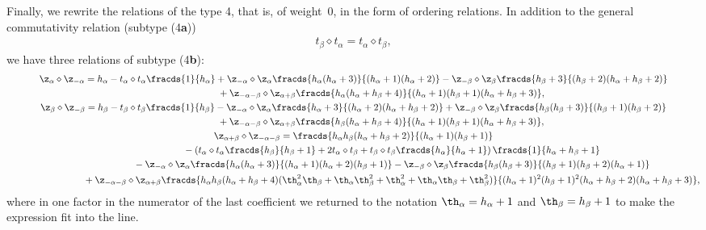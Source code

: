 \documentclass[pdftex]{sigma}
\def\a{\alpha}\def\Ar{{\rm A}}\def\Ab{\bar{\rm A}}\def\b{\beta}\def\bb{\mathfrak{b}}
\def\lb{\label}\def\lcd{\ts,\ldots,}\def\mult{\diamond}\def\n{\mathfrak{n}}\def\nminus{\mathfrak{n}_-}
\numberwithin{equation}{section}
\begin{document}
{}Finally, we rewrite the relations of the type 4, that is, of weight~0, in the form of ordering relations. In addition to the
general commutativity relation (subtype (4{\bf a}))
\begin{gather}
 t_\b\mult t_\a =t_\a\mult t_\b ,
\end{gather}
we have three relations of subtype (4{\bf b}):
\begin{gather}
\nonumber \z_\a\mult \z_{-\a} = h_\a -t_\a\mult t_\a \fracds{1}{h_\a}+\z_{-\a}\mult\z_\a \fracds{h_\a (h_\a +3)}{(h_\a +1)(h_\a +2)}
 -  \z_{-\b}\mult\z_\b  \fracds{h_\b +3}{(h_\b +2)(h_\a +h_\b +2)} \\
\phantom{\z_\a\mult \z_{-\a} =}{} + \z_{-\a -\b}\mult\z_{\a +\b} \fracds{h_\a (h_\a +h_\b +4)}{(h_\a +1)(h_\b +1)(h_\a +h_\b +3)} ,\label{zazma-rel}
\\
 \nonumber \z_\b\mult \z_{-\b}=h_\b -t_\b\mult t_\b \fracds{1}{h_\b}-\z_{-\a}\mult\z_\a \fracds{h_\a +3}{(h_\a +2)(h_\a +h_\b +2)}
 + \z_{-\b}\mult\z_\b \fracds{h_\b (h_\b +3)}{(h_\b +1)(h_\b +2)} \\
\phantom{\z_\b\mult \z_{-\b}=}{} +  \z_{-\a -\b}\mult\z_{\a +\b} \fracds{h_\b (h_\a +h_\b +4)}{(h_\a +1)(h_\b +1)(h_\a +h_\b +3)} ,\label{zbzmb-rel}\\
\nonumber \z_{\a +\b}\mult\z_{-\a -\b} =  \fracds{h_\a h_\b (h_\a +h_\b +2)}{(h_\a +1)(h_\b +1)} \\
\phantom{\z_{\a +\b}\mult\z_{-\a -\b} =}{}
 -  \left( t_\a\mult t_\a \fracds{h_\b}{h_\b +1}+2t_\a\mult t_\b +t_\b\mult t_\b \fracds{h_\a}{h_\a +1}
\right) \fracds{1}{h_\a +h_\b +1}\label{frel1} \\
\nonumber \phantom{\z_{\a +\b}\mult\z_{-\a -\b} =}{}  -  \z_{-\a}\mult\z_\a \fracds{h_\a (h_\a +3)}{(h_\a +1)(h_\a +2)(h_\b +1)}
  -  \z_{-\b}\mult\z_\b \fracds{h_\b (h_\b +3)}{(h_\b +1)(h_\b +2)(h_\a +1)}\\
\nonumber \phantom{\z_{\a +\b}\mult\z_{-\a -\b} =}{}
 +  \z_{-\a -\b}\mult\z_{\a +\b} \fracds{h_\a h_\b (h_\a +h_\b +4)
(\th_\a^2\th_\b+\th_\a\th_\b^2+\th_\a^2+\th_\a\th_\b+\th_\b^2)}{(h_\a +1)^2(h_\b +1)^2 (h_\a +h_\b +2)(h_\a +h_\b +3)} ,
\end{gather}
where in one factor in the numerator of the last coef\/f\/icient we returned to the notation $\th_\a=h_\a +1$ and $\th_\b=h_\b +1$ to make
the expression f\/it into the line.
\end{document}

